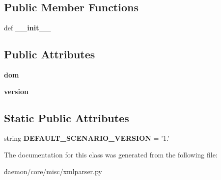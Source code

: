 \subsection*{Public Member Functions}
\begin{DoxyCompactItemize}
\item 
\hypertarget{classcore_1_1misc_1_1xmlparser_1_1_core_version_parser_a7df8214fd510c19b040b167e93736f66}{def {\bfseries \+\_\+\+\_\+init\+\_\+\+\_\+}}\label{classcore_1_1misc_1_1xmlparser_1_1_core_version_parser_a7df8214fd510c19b040b167e93736f66}

\end{DoxyCompactItemize}
\subsection*{Public Attributes}
\begin{DoxyCompactItemize}
\item 
\hypertarget{classcore_1_1misc_1_1xmlparser_1_1_core_version_parser_a0bcd8ab2d1d54e45df09971ef369c47a}{{\bfseries dom}}\label{classcore_1_1misc_1_1xmlparser_1_1_core_version_parser_a0bcd8ab2d1d54e45df09971ef369c47a}

\item 
\hypertarget{classcore_1_1misc_1_1xmlparser_1_1_core_version_parser_a93413d12be0c507e5fde9aa10ea61515}{{\bfseries version}}\label{classcore_1_1misc_1_1xmlparser_1_1_core_version_parser_a93413d12be0c507e5fde9aa10ea61515}

\end{DoxyCompactItemize}
\subsection*{Static Public Attributes}
\begin{DoxyCompactItemize}
\item 
\hypertarget{classcore_1_1misc_1_1xmlparser_1_1_core_version_parser_aad932e2032090cfc1cce7ed633294d12}{string {\bfseries D\+E\+F\+A\+U\+L\+T\+\_\+\+S\+C\+E\+N\+A\+R\+I\+O\+\_\+\+V\+E\+R\+S\+I\+O\+N} = '1.'}\label{classcore_1_1misc_1_1xmlparser_1_1_core_version_parser_aad932e2032090cfc1cce7ed633294d12}

\end{DoxyCompactItemize}


The documentation for this class was generated from the following file\+:\begin{DoxyCompactItemize}
\item 
daemon/core/misc/xmlparser.\+py\end{DoxyCompactItemize}
